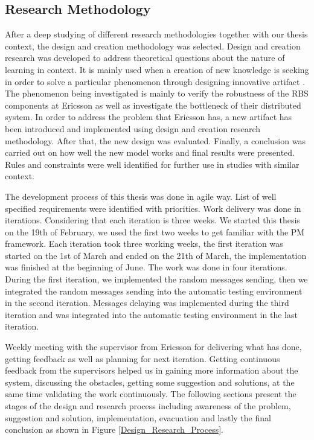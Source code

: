 \subsection{Research Methodology}
After a deep studying of different research methodologies together with our thesis context, the design and creation methodology was selected. Design and creation research was developed to address theoretical questions about the nature of learning in context. It is mainly used when a creation of new knowledge is seeking in order to solve a particular phenomenon through designing innovative artifact \cite{designresearch}. The phenomenon being investigated is mainly to verify the robustness of the RBS components at Ericsson as well as investigate the bottleneck of their distributed system. In order to address the problem that Ericsson has, a new artifact has been introduced and implemented using design and creation research methodology. After that, the new design was evaluated. Finally, a conclusion was carried out on how well the new model works and final results were presented. Rules and constraints were well identified for further use in studies with similar context. 

The development process of this thesis was done in agile way. List of well specified requirements were identified with priorities. Work delivery was done in iterations. Considering that each iteration is three weeks. We started this thesis on the 19th of February, we used the first two weeks to get familiar with the PM framework. Each iteration took three working weeks, the first iteration was started on the 1st of March and ended on the 21th of March, the implementation was finished at the beginning of June. The work was done in four iterations. During the first iteration, we implemented the random messages sending, then we integrated the random messages sending into the automatic testing environment in the second iteration. Messages delaying was implemented during the third iteration and was integrated into the automatic testing environment in the last iteration.

Weekly meeting with the supervisor from Ericsson for delivering what has done, getting feedback as well as planning for next iteration. Getting continuous feedback from the supervisors helped us in gaining more information about the system, discussing the obstacles, getting some suggestion and solutions, at the same time validating the work continuously. The following sections present the stages of the design and research process including awareness of the problem, suggestion and solution, implementation, evacuation and lastly the final conclusion as shown in Figure \ref{Design_Research_Process}. 

